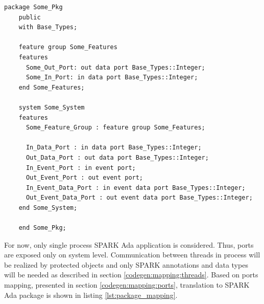 \singlespacing
\begin{lstlisting}[language=aadl, frame=single, gobble=0, caption={Sample AADL package with system}, label={lst:aadl_sample}]
	package Some_Pkg
	public
	with Base_Types;

	feature group Some_Features
	features
	  Some_Out_Port: out data port Base_Types::Integer;
	  Some_In_Port: in data port Base_Types::Integer;
	end Some_Features;

	system Some_System
	features
	  Some_Feature_Group : feature group Some_Features;
	  
	  In_Data_Port : in data port Base_Types::Integer;
	  Out_Data_Port : out data port Base_Types::Integer;
	  In_Event_Port : in event port;
	  Out_Event_Port : out event port;
	  In_Event_Data_Port : in event data port Base_Types::Integer;
	  Out_Event_Data_Port : out event data port Base_Types::Integer;
	end Some_System;

	end Some_Pkg;
\end{lstlisting}
\doublespacing

For now, only single process SPARK Ada application is considered. Thus, ports are exposed only on system level. Communication between threads in process will be realized by protected objects and only SPARK annotations and data types will be needed as described in section \ref{codegen:mapping:threads}. Based on ports mapping, presented in section \ref{codegen:mapping:ports}, translation to SPARK Ada package is shown in listing \ref{lst:package_mapping}. 

